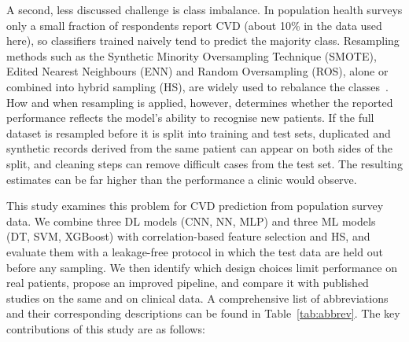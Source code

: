\documentclass[11pt,a4paper]{article}
\begin{document}
A second, less discussed challenge is class imbalance. In population health
surveys only a small fraction of respondents report CVD (about 10\% in the
data used here), so classifiers trained naively tend to predict the
majority class. Resampling methods such as the Synthetic Minority
Oversampling Technique (SMOTE), Edited Nearest Neighbours (ENN) and Random
Oversampling (ROS), alone or combined into hybrid sampling (HS), are widely
used to rebalance the classes~\cite{ishaq,singh2015,batista}. How and when
resampling is applied, however, determines whether the reported performance
reflects the model's ability to recognise new patients. If the full
dataset is resampled before it is split into training and test sets,
duplicated and synthetic records derived from the same patient can appear
on both sides of the split, and cleaning steps can remove difficult cases
from the test set. The resulting estimates can be far higher than the
performance a clinic would observe.

This study examines this problem for CVD prediction from population survey
data. We combine three DL models (CNN, NN, MLP) and three ML models (DT, SVM,
XGBoost) with correlation-based feature selection and HS, and evaluate them
with a leakage-free protocol in which the test data are held out before any
sampling. We then identify which design choices limit performance on real
patients, propose an improved pipeline, and compare it with published
studies on the same and on clinical data. 
A comprehensive list of abbreviations and their corresponding
descriptions can be found in Table~\ref{tab:abbrev}. The key contributions of
this study are as follows:
\end{document}

